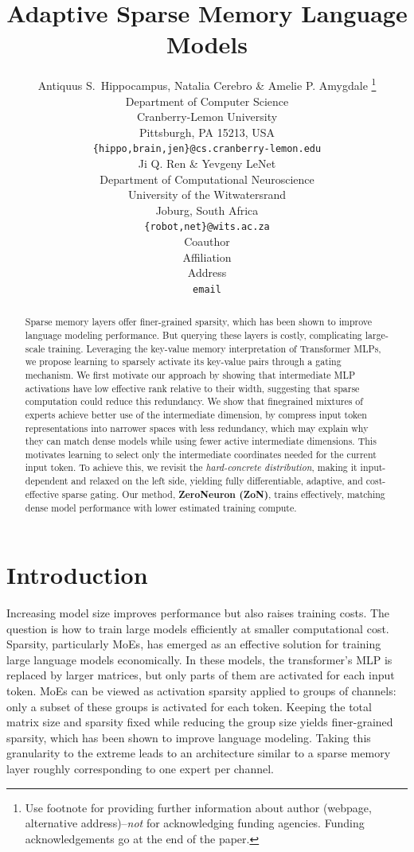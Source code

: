 \documentclass{article} %
\title{Adaptive Sparse Memory Language Models}
\author{Antiquus S.~Hippocampus, Natalia Cerebro \& Amelie P. Amygdale \thanks{ Use footnote for providing further information
about author (webpage, alternative address)--\emph{not} for acknowledging
funding agencies.  Funding acknowledgements go at the end of the paper.} \\
Department of Computer Science\\
Cranberry-Lemon University\\
Pittsburgh, PA 15213, USA \\
\texttt{\{hippo,brain,jen\}@cs.cranberry-lemon.edu} \\
\And
Ji Q. Ren \& Yevgeny LeNet \\
Department of Computational Neuroscience \\
University of the Witwatersrand \\
Joburg, South Africa \\
\texttt{\{robot,net\}@wits.ac.za} \\
\AND
Coauthor \\
Affiliation \\
Address \\
\texttt{email}
}
\begin{document}
\maketitle

\begin{abstract}
Sparse memory layers offer finer-grained sparsity, which has been shown 
to improve language modeling performance. But querying these layers is costly, 
complicating large-scale training.
Leveraging the key-value memory interpretation of Transformer MLPs,
we propose learning to sparsely activate its key-value pairs through a gating mechanism.
We first motivate our approach by showing that intermediate MLP activations have 
low effective rank relative to their width, suggesting that sparse computation could reduce this redundancy.
We show that finegrained mixtures of experts achieve better use of the intermediate dimension,
by compress input token representations into narrower spaces with less redundancy, 
which may explain why they can match dense models while using 
fewer active intermediate dimensions. This motivates learning to select only the intermediate 
coordinates needed for the current input token. To achieve this, we revisit the \textit{hard-concrete distribution}, 
making it input-dependent and relaxed on the left side, yielding fully differentiable, 
adaptive, and cost-effective sparse gating.
Our method, \textbf{ZeroNeuron (ZoN)}, trains effectively, matching dense model performance 
with lower estimated training compute.
\end{abstract}

\section{Introduction}
Increasing model size improves performance but also raises training costs. The question
is how to train large models efficiently at smaller computational cost. 
Sparsity, particularly MoEs, has emerged as an
effective solution for training large language models economically. In these models, the transformer's
MLP is replaced by larger matrices, but only parts of them are activated for each input token.
MoEs can be viewed as activation sparsity applied to groups of channels: only a subset of
these groups is activated for each token. Keeping the total matrix size and sparsity fixed while reducing
the group size yields finer-grained sparsity, which has been shown to improve language
modeling. Taking this granularity to the extreme leads to an architecture similar to
a sparse memory layer \citep{he2024mixturemillionexperts, NEURIPS2019_9d8df73a} 
roughly corresponding to one expert per channel.
\end{document}
